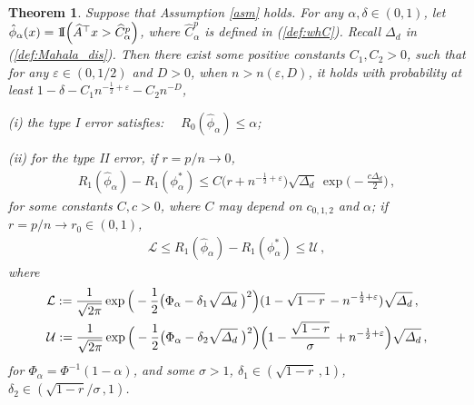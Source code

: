 \documentclass[12pt]{article}
\numberwithin{equation}{section}
\newtheorem{thm}{Theorem}
\theoremstyle{remark}
\newcommand{\1}{{\rm 1}\kern-0.24em{\rm I}}
\begin{document}

\begin{thm} \label{mainthm}
Suppose that Assumption \ref{asm} holds. For any $\alpha, \delta \in(0,1)$, let  $\hat{\phi}_\alpha(x)= \1 \Big( \widehat{A} ^{\top} x > \widehat C_\alpha^p\Big)$, where $\widehat C_\alpha^p$ is defined in (\ref{def:whC}). Recall $\varDelta_d$  in (\ref{def:Mahala_dis}). Then there exist some positive constants $C_1, C_2>0$, such that for any $\varepsilon\in (0, 1/2)$ and $D>0$, when $n>n(\varepsilon, D)$,  it holds with probability at least $1- \delta - C_1 n^{-\frac 12+ \varepsilon} -C_2 n^{-D} $,

\noindent (i) the type I error satisfies:  $\quad R_0(\hat{\phi}_\alpha)\leq \alpha $;

\noindent (ii) for the type II error,  if $r = p/n \to 0$,
\begin{align} \label{IIerror:p/n-0}
R_1(\hat{\phi}_\alpha) - R_1({\phi}_\alpha^*) \leq  C\Big(r + n^{-\frac12+ \varepsilon}\Big)\sqrt{\varDelta_d}\,  \exp\Big(- \frac{c\varDelta_d}{2}\Big)\, ,
\end{align}
for some constants $C, c>0$, where $C$ may depend on $c_{0,1,2}$ and $\alpha$;
 if $r= p/n\to r_0\in (0, 1)$, 
\begin{align*}
\mathcal{L}\leq R_1(\hat{\phi}_\alpha) - R_1({\phi}_\alpha^*) \leq 
 \mathcal{U}\,,
\end{align*}
where 
\begin{align*}
&\mathcal{L}:=\frac{1}{\sqrt {2\pi }} \exp\Big( -\frac 12 \big(\Phi_\alpha - \delta_1 \sqrt{\varDelta_d}\; \big)^2\Big)  (1-\sqrt{1-r} \, -n^{-\frac{1}{2}+ \varepsilon} )\sqrt{\varDelta_d}\,, \notag\\
&\mathcal{U}:=\frac{1}{\sqrt {2\pi }} \exp\Big( -\frac 12 \big(\Phi_\alpha - \delta_2 \sqrt{\varDelta_d}\; \big)^2\Big)  \Big(1-\frac{\sqrt{1-r}}{\sigma} \, + n^{-\frac{1}{2}+ \varepsilon}\Big)\sqrt{\varDelta_d}\,,
\end{align*}
for $\Phi_\alpha=\Phi^{-1}(1-\alpha)$, and some $\sigma>1$, $\delta_1\in (\sqrt{1-r}\, , 1)$, $\delta_2\in(\sqrt{1-r}/\sigma\, , 1)$.

\end{thm}
\end{document}
